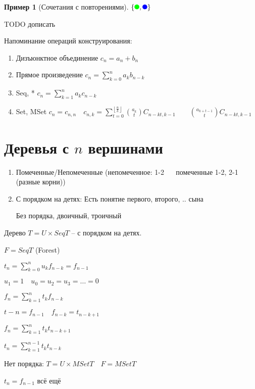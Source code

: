 \documentclass{book}
\theoremstyle{definition}
\newtheorem*{example}{Пример}
\begin{document}
\begin{example}
    [Сочетания с повторениями]
    $\{\tikz \fill[green] (0,0) circle [radius=.12];, \tikz \fill[blue] (0,0) circle [radius=.12];\}$ 

    TODO дописать
\end{example}



 Напоминание операций конструирования:
 \begin{enumerate}
     \item Дизъюнктное объединение $c_n = a_n+b_n$
     \item Прямое произведение $c_n = \sum_{k=0}^{n} a_kb_{n-k}$ 
     \item Seq, * $c_n = \sum_{k=1}^{n} a_kc_{n-k}$ 
 \item Set, MSet $c_n = c_{n,n}\quad c_{n,k} = \sum_{t=0}^{\left\lfloor \frac{n}{k} \right\rfloor} {a_k\choose t} C_{n-kt, k-1}\qquad {a_{k+t-1}\choose t} C_{n-kt, k-1}$
 \end{enumerate}

 \section{Деревья с $n$ вершинами}

 \begin{enumerate}
     \item Помеченные/Непомеченные (непомеченное: 1-2 $\quad$ помеченные 1-2, 2-1 (разные корни))
     \item С порядком на детях: Есть понятие первого, второго, .. сына
       
         Без порядка, двоичный, троичный
 \end{enumerate}

Дерево $T = U \times Seq T$ -- с порядком на детях.

$F = Seq T$ (Forest)

$t_n = \sum_{k=0}^{n} u_kf_{n-k} = f_{n-1}$

$u_1=1\quad u_0=u_2=u_3=\ldots = 0$

$f_n = \sum_{k=1}^{n} t_kf_{n-k}$ 

$t-n = f_{n-1}\quad f_{n-k} = t_{n-k+1}$

$f_n = \sum_{k=1}^{n} t_kt_{n-k+1}$ 

$t_n = \sum_{k=1}^{n-1} t_kt_{n-k}$ 



Нет порядка: $T = U \times MSet T\quad F = MSet T$

$t_n = f_{n-1}$ всё ещё
\end{document}
